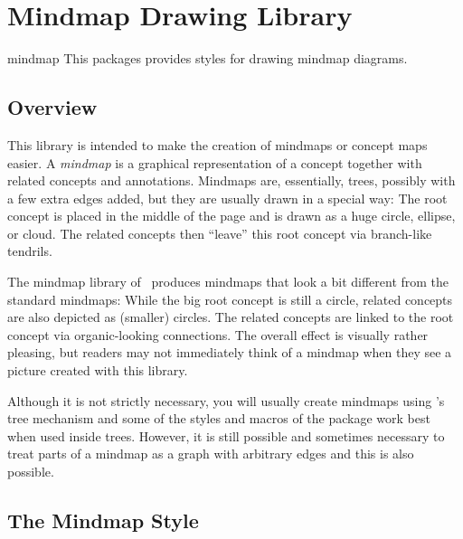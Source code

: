 %
%
%


\section{Mindmap Drawing Library}

\begin{tikzlibrary}{mindmap}
    This packages provides styles for drawing mindmap diagrams.
\end{tikzlibrary}


\subsection{Overview}

This library is intended to make the creation of mindmaps or concept maps
easier. A \emph{mindmap} is a graphical representation of a concept together
with related concepts and annotations. Mindmaps are, essentially, trees,
possibly with a few extra edges added, but they are usually drawn in a special
way: The root concept is placed in the middle of the page and is drawn as a
huge circle, ellipse, or cloud. The related concepts then ``leave'' this root
concept via branch-like tendrils.

The mindmap library of \tikzname\ produces mindmaps that look a bit different
from the standard mindmaps: While the big root concept is still a circle,
related concepts are also depicted as (smaller) circles. The related concepts
are linked to the root concept via organic-looking connections. The overall
effect is visually rather pleasing, but readers may not immediately think of a
mindmap when they see a picture created with this library.

Although it is not strictly necessary, you will usually create mindmaps using
\tikzname's tree mechanism and some of the styles and macros of the package
work best when used inside trees. However, it is still possible and sometimes
necessary to treat parts of a mindmap as a graph with arbitrary edges and this
is also possible.


\subsection{The Mindmap Style}

